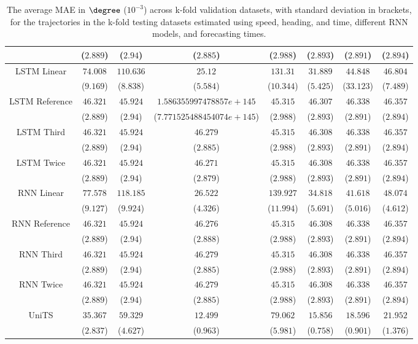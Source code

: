 \begin{table}[!ht]
{\begin{tabular}{|c|c|c|c|c|c|c|c|}
			 & ($2.889$) & ($2.94$) & ($2.885$) & ($2.988$) & ($2.893$) & ($2.891$) & ($2.894$) \\ \hline
			\multirow{2}{*}{LSTM Linear} & $74.008$ & $110.636$ & $25.12$ & $131.31$ & $31.889$ & $44.848$ & $46.804$ \\
			 & ($9.169$) & ($8.838$) & ($5.584$) & ($10.344$) & ($5.425$) & ($33.123$) & ($7.489$) \\ \hline
			\multirow{2}{*}{LSTM Reference} & $46.321$ & $45.924$ & $1.586355997478857e+145$ & $45.315$ & $46.307$ & $46.338$ & $46.357$ \\
			 & ($2.889$) & ($2.94$) & ($7.771525488454074e+145$) & ($2.988$) & ($2.893$) & ($2.891$) & ($2.894$) \\ \hline
			\multirow{2}{*}{LSTM Third} & $46.321$ & $45.924$ & $46.279$ & $45.315$ & $46.308$ & $46.338$ & $46.357$ \\
			 & ($2.889$) & ($2.94$) & ($2.885$) & ($2.988$) & ($2.893$) & ($2.891$) & ($2.894$) \\ \hline
			\multirow{2}{*}{LSTM Twice} & $46.321$ & $45.924$ & $46.271$ & $45.315$ & $46.308$ & $46.338$ & $46.357$ \\
			 & ($2.889$) & ($2.94$) & ($2.879$) & ($2.988$) & ($2.893$) & ($2.891$) & ($2.894$) \\ \hline
			\multirow{2}{*}{RNN Linear} & $77.578$ & $118.185$ & $26.522$ & $139.927$ & $34.818$ & $41.618$ & $48.074$ \\
			 & ($9.127$) & ($9.924$) & ($4.326$) & ($11.994$) & ($5.691$) & ($5.016$) & ($4.612$) \\ \hline
			\multirow{2}{*}{RNN Reference} & $46.321$ & $45.924$ & $46.276$ & $45.315$ & $46.308$ & $46.338$ & $46.357$ \\
			 & ($2.889$) & ($2.94$) & ($2.888$) & ($2.988$) & ($2.893$) & ($2.891$) & ($2.894$) \\ \hline
			\multirow{2}{*}{RNN Third} & $46.321$ & $45.924$ & $46.279$ & $45.315$ & $46.308$ & $46.338$ & $46.357$ \\
			 & ($2.889$) & ($2.94$) & ($2.885$) & ($2.988$) & ($2.893$) & ($2.891$) & ($2.894$) \\ \hline
			\multirow{2}{*}{RNN Twice} & $46.321$ & $45.924$ & $46.279$ & $45.315$ & $46.308$ & $46.338$ & $46.357$ \\
			 & ($2.889$) & ($2.94$) & ($2.885$) & ($2.988$) & ($2.893$) & ($2.891$) & ($2.894$) \\ \hline
			\multirow{2}{*}{UniTS} & $35.367$ & $59.329$ & $12.499$ & $79.062$ & $15.856$ & $18.596$ & $21.952$ \\
			 & ($2.837$) & ($4.627$) & ($0.963$) & ($5.981$) & ($0.758$) & ($0.901$) & ($1.376$) \\ \hline
		\end{tabular}
	}
	\caption{The average MAE in $\degree$ ($10^{-3}$) across k-fold validation datasets, with standard deviation in brackets, for the trajectories in the k-fold testing datasets estimated using speed, heading, and time, different RNN models, and forecasting times.}
	\label{tab:all_speed_actual_dir_MAE}
\end{table}

